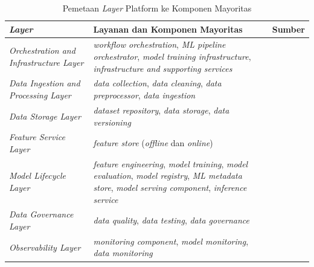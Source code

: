 \begin{table}[H]
\centering
\caption{Pemetaan \textit{Layer} Platform ke Komponen Mayoritas}
\label{tab:layanan_industri}
\footnotesize
\setlength{\tabcolsep}{3pt}
\begin{tabular}{|>{\raggedright\arraybackslash}m{3.4cm}|>{\raggedright\arraybackslash}m{6.35cm}|>{\raggedright\arraybackslash}m{3.5cm}|}
\hline
\centering\arraybackslash\textbf{\textit{Layer}} & \centering\arraybackslash\textbf{Layanan dan Komponen Mayoritas} & \centering\arraybackslash\textbf{Sumber} \\
\hline
\textit{Orchestration and Infrastructure Layer} & \textit{workflow orchestration}, \textit{ML pipeline orchestrator}, \textit{model training infrastructure}, \textit{infrastructure and supporting services} & \autocite{kreuzberger2023mlops,najafabadi2024analysis,googlecloud2024mlops} \\
\hline
\textit{Data Ingestion and Processing Layer} & \textit{data collection}, \textit{data cleaning}, \textit{data preprocessor}, \textit{data ingestion} & \autocite{amershi2019software,najafabadi2024analysis,munappy2020adhoc} \\
\hline
\textit{Data Storage Layer} & \textit{dataset repository}, \textit{data storage}, \textit{data versioning} & \autocite{najafabadi2024analysis,munappy2020adhoc,jain2025integrating} \\
\hline
\textit{Feature Service Layer} & \textit{feature store} (\textit{offline} dan \textit{online}) & \autocite{kreuzberger2023mlops,googlecloud2024mlops,najafabadi2024analysis} \\
\hline
\textit{Model Lifecycle Layer} & \textit{feature engineering}, \textit{model training}, \textit{model evaluation}, \textit{model registry}, \textit{ML metadata store}, \textit{model serving component}, \textit{inference service} & \autocite{kreuzberger2023mlops,amershi2019software,googlecloud2024mlops,najafabadi2024analysis} \\
\hline
\textit{Data Governance Layer} & \textit{data quality}, \textit{data testing}, \textit{data governance} & \autocite{munappy2020adhoc,rella2022mlops,jain2025integrating} \\
\hline
\textit{Observability Layer} & \textit{monitoring component}, \textit{model monitoring}, \textit{data monitoring} & \autocite{kreuzberger2023mlops,amershi2019software,najafabadi2024analysis,munappy2020adhoc} \\

\end{tabular}
\end{table}
